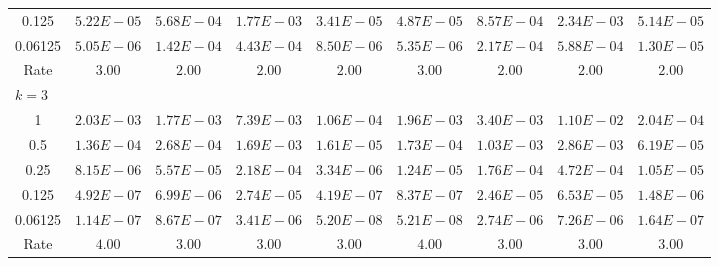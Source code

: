 \documentclass[english,11pt,3p,number,sort&compress]{elsarticle}
\begin{document}
\begin{table}[H]
{\begin{tabular}{c c c c c | c c c c}
		0.125   & $5.22E-05$ & $5.68E-04$ & $1.77E-03$ & $3.41E-05$ & $4.87E-05$ & $8.57E-04$ & $2.34E-03$ & $5.14E-05$ \\
		0.06125 & $5.05E-06$ & $1.42E-04$ & $4.43E-04$ & $8.50E-06$ & $5.35E-06$ & $2.17E-04$ & $5.88E-04$ & $1.30E-05$ \\
		Rate & $3.00$ & $2.00$ & $2.00$ & $2.00$ & $3.00$ & $2.00$ & $2.00$ & $2.00$ \\
		\midrule
		\multicolumn{9}{l}{$k = 3$} \\
		1       & $2.03E-03$ & $1.77E-03$ & $7.39E-03$ & $1.06E-04$ & $1.96E-03$ & $3.40E-03$ & $1.10E-02$ & $2.04E-04$ \\
		0.5     & $1.36E-04$ & $2.68E-04$ & $1.69E-03$ & $1.61E-05$ & $1.73E-04$ & $1.03E-03$ & $2.86E-03$ & $6.19E-05$ \\
		0.25    & $8.15E-06$ & $5.57E-05$ & $2.18E-04$ & $3.34E-06$ & $1.24E-05$ & $1.76E-04$ & $4.72E-04$ & $1.05E-05$ \\
		0.125   & $4.92E-07$ & $6.99E-06$ & $2.74E-05$ & $4.19E-07$ & $8.37E-07$ & $2.46E-05$ & $6.53E-05$ & $1.48E-06$ \\
		0.06125 & $1.14E-07$ & $8.67E-07$ & $3.41E-06$ & $5.20E-08$ & $5.21E-08$ & $2.74E-06$ & $7.26E-06$ & $1.64E-07$ \\
		Rate & $4.00$ & $3.00$ & $3.00$ & $3.00$ & $4.00$ & $3.00$ & $3.00$ & $3.00$ \\
        \bottomrule
    \end{tabular}}
	\label{tab:bishop-convergence-049}
\end{table}
\end{document}
